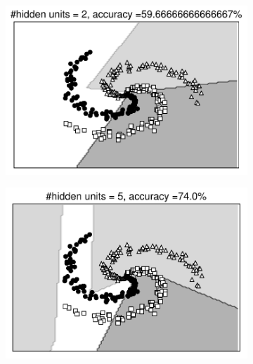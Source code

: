 \begin{figure}[t]
\begin{subfigure}{0.45\textwidth}
\includegraphics[width=0.99\linewidth]{ebookML_src/src/mlp/ex_res2.pdf}
\caption{}
\end{subfigure}
\begin{subfigure}{0.45\textwidth}
\includegraphics[width=0.99\linewidth]{ebookML_src/src/mlp/ex_res5.pdf}
\caption{}
\end{subfigure}


\end{figure}
